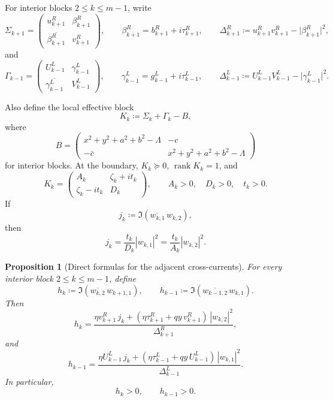 \documentclass[11pt]{article}
\newtheorem{proposition}[theorem]{Proposition}
\begin{document}
For interior blocks \(2\le k\le m-1\), write
\[
\Sigma_{k+1}=
\begin{pmatrix}
u_{k+1}^R & \beta_{k+1}^R\\
\overline{\beta_{k+1}^R} & v_{k+1}^R
\end{pmatrix},
\qquad
\beta_{k+1}^R=b_{k+1}^R+i\tau_{k+1}^R,
\qquad
\Delta_{k+1}^R\coloneqq
u_{k+1}^R v_{k+1}^R-\bigl|\beta_{k+1}^R\bigr|^2,
\]
and
\[
\Gamma_{k-1}=
\begin{pmatrix}
U_{k-1}^L & \gamma_{k-1}^L\\
\overline{\gamma_{k-1}^L} & V_{k-1}^L
\end{pmatrix},
\qquad
\gamma_{k-1}^L=g_{k-1}^L+i\tau_{k-1}^L,
\qquad
\Delta_{k-1}^L\coloneqq
U_{k-1}^L V_{k-1}^L-\bigl|\gamma_{k-1}^L\bigr|^2.
\]

Also define the local effective block
\[
K_k\coloneqq \Sigma_k+\Gamma_k-B,
\]
where
\[
B=
\begin{pmatrix}
x^2+y^2+a^2+b^2-\Lambda & -c\\
-\bar c & x^2+y^2+a^2+b^2-\Lambda
\end{pmatrix}
\]
for interior blocks. At the boundary, \(K_k\succeq 0\), \(\operatorname{rank}K_k=1\), and
\[
K_k=
\begin{pmatrix}
A_k & \zeta_k+i t_k\\
\zeta_k-i t_k & D_k
\end{pmatrix},
\qquad
A_k>0,\quad D_k>0,\quad t_k>0.
\]
If
\[
j_k\coloneqq \Im(\overline{w_{k,1}}\,w_{k,2}),
\]
then
\[
j_k=\frac{t_k}{D_k}|w_{k,1}|^2=\frac{t_k}{A_k}|w_{k,2}|^2.
\]

\begin{proposition}[Direct formulas for the adjacent cross-currents]
For every interior block \(2\le k\le m-1\), define
\[
h_k\coloneqq \Im(\overline{w_{k,2}}\,w_{k+1,1}),
\qquad
h_{k-1}\coloneqq \Im(\overline{w_{k-1,2}}\,w_{k,1}).
\]
Then
\[
h_k
=
\frac{
\eta v_{k+1}^R\,j_k
+
(\eta\tau_{k+1}^R+qy\,v_{k+1}^R)\,|w_{k,2}|^2
}{
\Delta_{k+1}^R
},
\]
and
\[
h_{k-1}
=
\frac{
\eta U_{k-1}^L\,j_k
+
(\eta\tau_{k-1}^L+qy\,U_{k-1}^L)\,|w_{k,1}|^2
}{
\Delta_{k-1}^L
}.
\]
In particular,
\[
h_k>0,
\qquad
h_{k-1}>0.
\]
\end{proposition}
\end{document}
